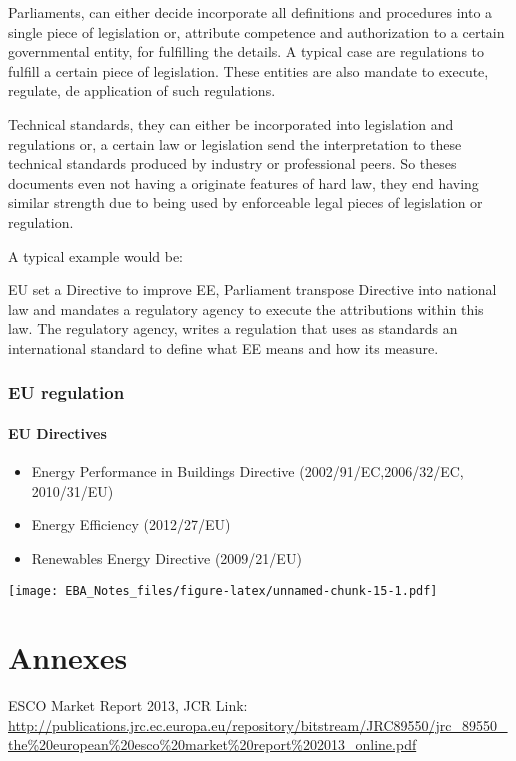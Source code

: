 \documentclass[]{book}
\theoremstyle{definition}
\theoremstyle{definition}
\theoremstyle{definition}
\theoremstyle{remark}
\begin{document}
Parliaments, can either decide incorporate all definitions and
procedures into a single piece of legislation or, attribute competence
and authorization to a certain governmental entity, for fulfilling the
details. A typical case are regulations to fulfill a certain piece of
legislation. These entities are also mandate to execute, regulate, de
application of such regulations.

Technical standards, they can either be incorporated into legislation
and regulations or, a certain law or legislation send the interpretation
to these technical standards produced by industry or professional peers.
So theses documents even not having a originate features of hard law,
they end having similar strength due to being used by enforceable legal
pieces of legislation or regulation.

A typical example would be:

EU set a Directive to improve EE, Parliament transpose Directive into
national law and mandates a regulatory agency to execute the
attributions within this law. The regulatory agency, writes a regulation
that uses as standards an international standard to define what EE means
and how its measure.

\subsection{EU regulation}\label{eu-regulation}

\subsubsection{EU Directives}\label{eu-directives}

\begin{itemize}
\item
  Energy Performance in Buildings Directive (2002/91/EC,2006/32/EC,
  2010/31/EU)
\item
  Energy Efficiency (2012/27/EU)
\item
  Renewables Energy Directive (2009/21/EU)
\end{itemize}

\texttt{[image: EBA\_Notes\_files/figure-latex/unnamed-chunk-15-1.pdf]}

\chapter{Annexes}\label{annexes}

ESCO Market Report 2013, JCR Link:
\url{http://publications.jrc.ec.europa.eu/repository/bitstream/JRC89550/jrc_89550_the\%20european\%20esco\%20market\%20report\%202013_online.pdf}
\end{document}
